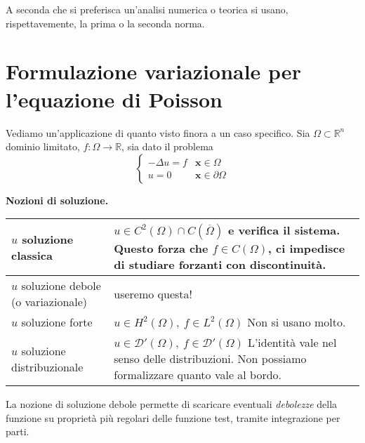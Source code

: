 \documentclass[10pt,a4paper,twoside,openright]{book}
\newcommand{\x}{\mathbf{x}}
\begin{document}
A seconda che si preferisca un'analisi numerica o teorica si usano, rispettavemente, la prima o la seconda norma.
\chapter{Formulazione variazionale per l'equazione di Poisson}

Vediamo un'applicazione di quanto visto finora a un caso specifico. Sia $\displaystyle \Omega \subset \mathbb{R}^{n}$ dominio limitato, $\displaystyle f:\Omega \rightarrow \mathbb{R}$, sia dato il problema
\begin{equation}
    \begin{cases}
        -\Delta u=f & \x \in \Omega          \\
        u=0         & \x \in \partial \Omega
    \end{cases}
    \label{eq:af-problema-poisson}
\end{equation}
\vspace*{0.5cm}
\begin{center}
    \textbf{Nozioni di soluzione.}
\end{center}
\begin{center}
    {\renewcommand{\arraystretch}{2.8}%
        \begin{tabular}{|l|l|}
            \hline
            $u$ soluzione classica        & \makecell[l]{$\displaystyle u\in C^{2}(\Omega) \cap C(\overline{\Omega })$ e verifica il sistema. \\Questo forza che $\displaystyle f\in C(\Omega)$, ci impedisce di studiare\\forzanti con discontinuità.} \\
            \hline
            \makecell[l]{$u$ soluzione debole                                                                                                 \\(o variazionale)} & useremo questa! \\
            \hline
            $u$ soluzione forte           & \makecell[l]{$\displaystyle u\in H^{2}(\Omega) ,\ f\in L^{2}(\Omega)$                             \\Non si usano molto.} \\
            \hline
            $u$ soluzione distribuzionale & \makecell[l]{$\displaystyle u\in \mathcal{D} '(\Omega) ,\ f\in \mathcal{D} '(\Omega)$             \\L'identità vale nel senso delle distribuzioni.\\Non possiamo formalizzare quanto vale al bordo.} \\
            \hline
        \end{tabular}
    }
\end{center}
\vspace*{0.5cm}
La nozione di soluzione debole permette di scaricare eventuali \textit{debolezze} della funzione su proprietà più regolari delle funzione test, tramite integrazione per parti.
\end{document}
